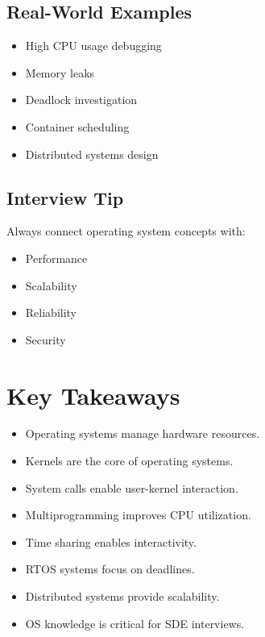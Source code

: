 \subsection{Real-World Examples}

\begin{itemize}
\item High CPU usage debugging
\item Memory leaks
\item Deadlock investigation
\item Container scheduling
\item Distributed systems design
\end{itemize}

\subsection{Interview Tip}

Always connect operating system concepts with:

\begin{itemize}
\item Performance
\item Scalability
\item Reliability
\item Security
\end{itemize}

\section{Key Takeaways}

\begin{itemize}
\item Operating systems manage hardware resources.
\item Kernels are the core of operating systems.
\item System calls enable user-kernel interaction.
\item Multiprogramming improves CPU utilization.
\item Time sharing enables interactivity.
\item RTOS systems focus on deadlines.
\item Distributed systems provide scalability.
\item OS knowledge is critical for SDE interviews.
\end{itemize}

